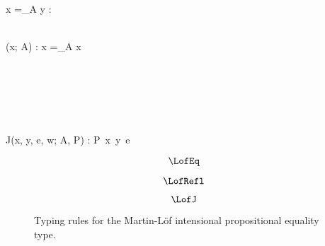 
\Rule{\LofEq}
    {
        \\ 
        \\ 
    }
    {\Gamma \vdash x =_A y : \star}
    {}

\Rule{\LofRefl}
    {
        \\ 
    }
    {\Gamma \vdash \prefl(x; A) : x =_A x}
    {}

\Rule{\LofJ}
    {
        \\ 
        \\ 
        \\ 
        \\ 
        \\ 
    }
    {\Gamma \vdash J(x, y, e, w; A, P) : P\ x\ y\ e}
    {}

\begin{figure}
    \centering
    \begin{minipage}{0.5\textwidth}
        $$\LofEq$$
    \end{minipage}%
    \begin{minipage}{0.5\textwidth}
        $$\LofRefl$$
    \end{minipage}%
    $$\LofJ$$
    \caption{
        Typing rules for the Martin-L\"{o}f intensional propositional equality type.
    }
    \label{fig:lof_eq}
\end{figure}

